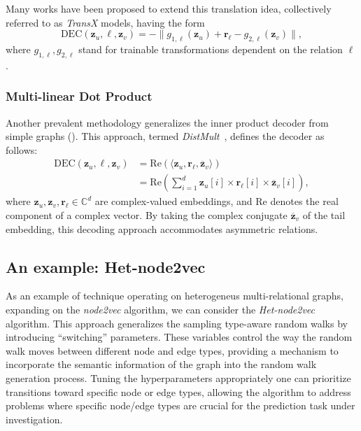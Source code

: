 Many works have been proposed to extend this translation idea, collectively referred to as \textit{TransX} models, having the form
\begin{equation*}
    \text{DEC}(\mathbf{z}_u, \ell, \mathbf{z}_v) = -\|g_{1,\ell}(\mathbf{z}_u) + \mathbf{r}_\ell - g_{2,\ell}(\mathbf{z}_v)\|,
\end{equation*}
where $ g_{1,\ell}, g_{2,\ell} $ stand for trainable transformations dependent on the relation $ \ell $.

\subsubsection{Multi-linear Dot Product}
Another prevalent methodology generalizes the inner product decoder from simple graphs (). This approach, termed \textit{DistMult}~\cite{Yang2014DistMult}, defines the decoder as follows:
\begin{align*}
\text{DEC}(\mathbf{z}_u, \ell, \mathbf{z}_v) &= \text{Re}(\langle \mathbf{z}_u, \mathbf{r}_\ell, \overline{\mathbf{z}}_v\rangle)\\
&= \text{Re}(\sum_{i=1}^d \mathbf{z}_u[i] \times \mathbf{r}_\ell[i] \times \overline{\mathbf{z}}_v[i]),
\end{align*}
where $ \mathbf{z}_u, \mathbf{z}_v, \mathbf{r}_\ell \in \mathbb{C}^d $ are complex-valued embeddings, and $ \text{Re} $ denotes the real component of a complex vector. By taking the complex conjugate $ \overline{\mathbf{z}}_v $ of the tail embedding, this decoding approach accommodates asymmetric relations.

\subsection{An example: Het-node2vec}
As an example of technique operating on heterogeneus multi-relational graphs, expanding on the \textit{node2vec} algorithm, we can consider the \textit{Het-node2vec}~\cite{soto2021hetnode2vec} algorithm. This approach generalizes the sampling type-aware random walks  by introducing ``switching'' parameters. These variables control the way the random walk moves between
different node and edge types, providing a mechanism to incorporate the semantic information of the graph into the random walk generation process. Tuning the hyperparameters appropriately one can prioritize transitions toward specific node or edge types, allowing the algorithm to address problems where specific node/edge types are crucial for the prediction task under investigation.

